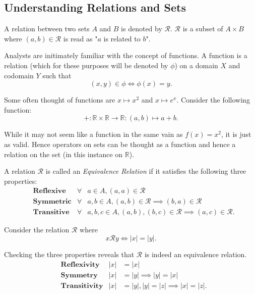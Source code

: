 \documentclass[../notes.tex]{subfiles}
\begin{document}

\subsection{Understanding Relations and Sets}

\begin{definition}[Relations]
	A relation between two sets $A$ and $B$ is denoted by $\mathcal{R}$. $\mathcal{R}$ is a subset of $A \times B$ where $(a,b) \in \mathcal{R}$ is read as "$a$ is related to $b$".
\end{definition}

Analysts are initimately familiar with the concept of functions. A function is a relation (which for these purposes will be denoted by $\phi$) on a domain $X$ and codomain $Y$ such that
\[
	(x, y) \in \phi \Longleftrightarrow \phi(x) = y
.\]

Some often thought of functions are $x \mapsto x^2$ and $x \mapsto e^x$. Consider the following function:
\[
	+ : \mathbb{R} \times \mathbb{R} \rightarrow \mathbb{R} : (a,b) \mapsto a + b
.\]

While it may not seem like a function in the same vain as $f(x) = x^2$, it is just as valid. Hence operators on sets can be thought as a function and hence a relation on the set (in this instance on $\mathbb{R}$).

\begin{definition}
	A relation $\mathcal{R}$ is called an \textit{Equivalence Relation} if it satisfies the following three properties:
	\begin{align*}
		&\textbf{Reflexive} &\forall &a \in A, (a,a) \in \mathcal{R} \\
		&\textbf{Symmetric} &\forall &a,b \in A, (a,b) \in \mathcal{R} \implies (b,a) \in \mathcal{R} \\
		&\textbf{Transitive} &\forall &a,b,c \in A, (a,b), (b,c) \in \mathcal{R} \implies (a,c) \in \mathcal{R}
	.\end{align*}
\end{definition}


Consider the relation $\mathcal{R}$ where
\[
	x \mathcal{R} y \Longleftrightarrow |x| = |y|
.\]

Checking the three properties reveals that $\mathcal{R}$ is indeed an equivalence relation.
\begin{align*}
		&\textbf{Reflexivity} &|x| &= |x| \\
		&\textbf{Symmetry} &|x| &= |y| \implies |y|=|x| \\
		&\textbf{Transitivity} &|x| &= |y|, |y|=|z| \implies |x| = |z|
.\end{align*}
\end{document}
